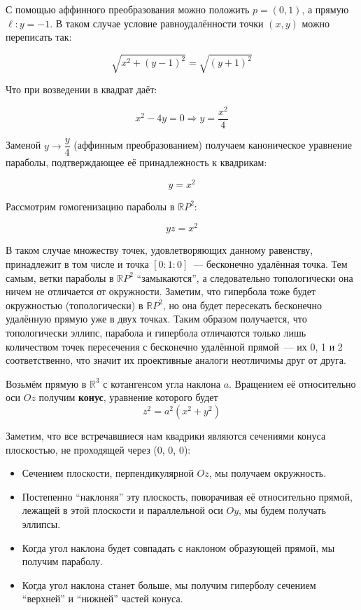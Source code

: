 \documentclass[11pt]{report}
\begin{document}
    С помощью аффинного преобразования можно положить $p = (0, 1)$, а прямую $\ell\colon y = -1$. В таком случае условие равноудалённости точки $(x, y)$ можно переписать так:

    \begin{equation*}
        \sqrt{x^2 + (y - 1)^2} = \sqrt{(y + 1)^2}
    \end{equation*}

    Что при возведении в квадрат даёт:

    \begin{equation*}
        x^2 - 4y = 0 \Longrightarrow y = \dfrac{x^2}{4}
    \end{equation*}

    Заменой $y \to \dfrac{y}{4}$ (аффинным преобразованием) получаем каноническое уравнение параболы, подтверждающее её принадлежность к квадрикам:

    \begin{equation*}
        y = x^2
    \end{equation*}

    Рассмотрим гомогенизацию параболы в $\mathbb{R}P^2$:

    \begin{equation*}
        yz = x^2
    \end{equation*}

    В таком случае множеству точек, удовлетворяющих данному равенству, принадлежит в том числе и точка $[0:1:0]$~--- бесконечно удалённая точка. Тем самым, ветки параболы в $\mathbb{R}P^2$ ``замыкаются'', а следовательно топологически она ничем не отличается от окружности. Заметим, что гипербола тоже будет окружностью (топологически) в $\mathbb{R}P^2$, но она будет пересекать бесконечно удалённую прямую уже в двух точках. Таким образом получается, что топологически эллипс, парабола и гипербола отличаются только лишь количеством точек пересечения с бесконечно удалённой прямой~--- их 0, 1 и 2 соответственно, что значит их проективные аналоги неотличимы друг от друга.


    Возьмём прямую в $\mathbb{R}^3$ с котангенсом угла наклона $a$. Вращением её относительно оси $Oz$ получим \textbf{конус}, уравнение которого будет
    \begin{equation*}
        z^2 = a^2(x^2 + y^2)
    \end{equation*}

    Заметим, что все встречавшиеся нам квадрики являются сечениями конуса плоскостью, не проходящей через (0, 0, 0):
    \begin{itemize}
        \item Сечением плоскости, перпендикулярной $Oz$, мы получаем окружность.
        \item Постепенно ``наклоняя'' эту плоскость, поворачивая её относительно прямой, лежащей в этой плоскости и параллельной оси $Oy$, мы будем получать эллипсы.
        \item Когда угол наклона будет совпадать с наклоном образующей прямой, мы получим параболу.
        \item Когда угол наклона станет больше, мы получим гиперболу сечением ``верхней'' и ``нижней'' частей конуса.
    \end{itemize}
\end{document}
